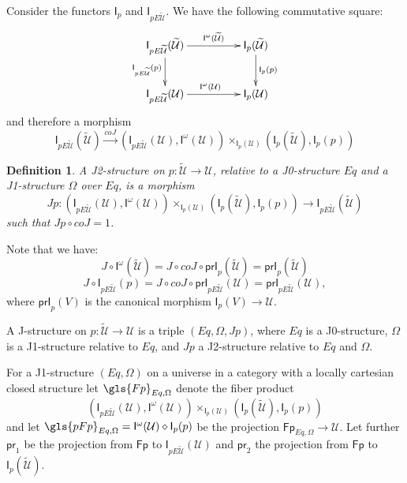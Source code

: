 \documentclass[12pt]{article}
\numberwithin{equation}{section}
\newenvironment{eq}{\begin{equation}}{\end{equation}}
\newtheorem{definition}[proposition]{Definition}
\newcommand{\sr}{\rightarrow}
\newcommand{\lr}{\longrightarrow}
\newcommand{\wt}{\widetilde}
\newcommand{\dd}{\diamond}
\newcommand{\id}{1}            %
\newcommand{\U}{\mathcal{U}}
\newcommand{\I}{\mathsf{I}}
\newcommand{\Fp}{\mathsf{Fp}}
\newcommand{\pr}{\mathsf{pr}}
\newcommand{\prI}{\mathsf{prI}}
\begin{document}
Consider the functors $\I_{p}$ and $\I_{pE\wt{\U}}$. We have the following
commutative square:
%
\begin{eq}\label{2010.sq1}
\begin{xy}
          \xymatrix@C=4pc{ \I_{pE\wt{\U}}(\wt{\U}) \ar[r]^-{\I^{\omega}(\wt{\U})}
            \ar[d]_{\I_{pE\wt{\U}}(p)} & \I_p(\wt{\U})
            \ar[d]^{\I_p(p)}\\ \I_{pE\wt{\U}}(\U) \ar[r]^{\I^{\omega}(\U)} & \I_p(\U) }
\end{xy}
\end{eq}%
%
and therefore a morphism
%
$$\I_{pE\wt{\U}}(\wt{\U}) \stackrel{coJ}{\lr} (\I_{pE\wt{\U}}(\U), \I^{\omega}(\U))
\times_{\I_p(\U)} (\I_p(\wt{\U}), \I_p(p))
$$
%
\begin{definition}
\label{2015.03.27.def6} A {\em J2-structure} on $p:\wt{\U}\sr \U$, relative to a J0-structure $Eq$
and a J1-structure $\Omega$ over $Eq$, is a morphism
%
$$ Jp:( \I_{pE\wt{\U}}(\U), \I^{\omega}(\U))\times_{\I_p(\U)} (\I_p(\wt{\U}), \I_p(p))\sr
\I_{pE\wt{\U}}(\wt{\U}) $$
%
such that $Jp\circ coJ = \id$.
\end{definition}
%
Note that we have:
%
\begin{eq}
\label{2015.04.04.eq1} J\circ \I^{\omega}(\wt{\U})=J\circ coJ\circ
\prI_p(\wt{\U})=\prI_{p}(\wt{\U})
\end{eq}%
%
\begin{eq}
\label{2015.04.04.eq2} J\circ \I_{pE\wt{\U}}(p)=J\circ coJ\circ
\prI_{pE\wt{\U}}(\U)=\prI_{pE\wt{\U}}(\U),
\end{eq}%
%
where $\prI_p(V)$ is the canonical morphism $\I_p(V)\sr \U$.

A J-structure on $p:\wt{\U}\sr \U$ is a triple $(Eq,\Omega,Jp)$, where $Eq$ is a J0-structure,
$\Omega$ is a J1-structure relative to $Eq$, and $Jp$ a J2-structure relative to
$Eq$ and $\Omega$.

For a J1-structure $(Eq,\Omega)$ on a universe in a category with a locally
cartesian closed structure let $\gls{Fp}_{Eq,\Omega}$ denote the fiber product
%
$$(\I_{pE\wt{\U}}(\U), \I^{\omega}(\U)) \times_{\I_p(\U)} (\I_p(\wt{\U}), \I_p(p))$$
%
and let $\gls{pFp}_{Eq,\Omega}=\I^{\omega}(\U)\dd \I_p(p)$ be the projection
$\Fp_{Eq,\Omega}\sr \U$. Let further $\pr_1$ be the projection from $\Fp$ to
$\I_{pE\wt{\U}}(\U)$ and $\pr_2$ the projection from $\Fp$ to $\I_p(\wt{\U})$.
\end{document}
